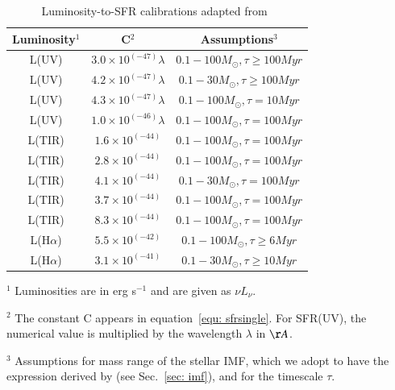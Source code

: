 \begin{table}
\centering
\caption{Luminosity-to-SFR calibrations adapted from~\cite{Calzetti13}}
\label{table1}
\begin{tabular}{ c c c }
\hline\hline
Luminosity$^1$ & C$^2$ & Assumptions$^3$\\
\hline
L(UV) & $3.0 \times 10^{(-47)} \lambda$ &$0.1 -100 M_{\odot}, \tau \ge 100 Myr $\\
L(UV) & $4.2 \times 10^{(-47)} \lambda$ &$0.1 -30 M_{\odot}, \tau \ge 100 Myr $\\
L(UV) & $4.3 \times 10^{(-47)}\lambda$ &$0.1 -100 M_{\odot}, \tau = 10 Myr $\\
L(UV) & $1.0 \times 10^{(-46)}\lambda$ &$0.1 -100 M_{\odot}, \tau = 100 Myr $\\
L(TIR) & $1.6 \times 10^{(-44)}$ &$0.1 -100 M_{\odot}, \tau = 100 Myr $\\
L(TIR) & $2.8 \times 10^{(-44)}$ &$0.1 -100 M_{\odot}, \tau = 100 Myr $\\
L(TIR) & $4.1 \times 10^{(-44)}$ &$0.1 -30 M_{\odot}, \tau = 100 Myr $\\
L(TIR) & $3.7 \times 10^{(-44)}$ &$0.1 -100 M_{\odot}, \tau = 100 Myr $\\
L(TIR) & $8.3 \times 10^{(-44)}$ &$0.1 -100 M_{\odot}, \tau = 100 Myr $\\
L(H${\alpha}$) & $5.5 \times 10^{(-42)}$&$0.1 -100 M_{\odot},  \tau \ge 6 Myr $\\
L(H${\alpha}$) & $3.1 \times 10^{(-41)}$&$0.1 -30 M_{\odot},  \tau \ge 10 Myr $\\
\hline
\end{tabular}
\begin{tablenotes}
\item $^1$ Luminosities are in erg s$^{-1}$ and are given as $\nu L_{\nu}$.
\item $^2$ The constant C appears in equation~\ref{equ: sfrsingle}. For SFR(UV), the numerical value is multiplied by the wavelength $\lambda$ in $\AA$.
\item $^3$ Assumptions for mass range of the stellar IMF, which we adopt to have the expression derived by \cite{Kroupa01} (see Sec.~\ref{sec: imf}), and for the timescale $\tau$.
\end{tablenotes}
\end{table}


